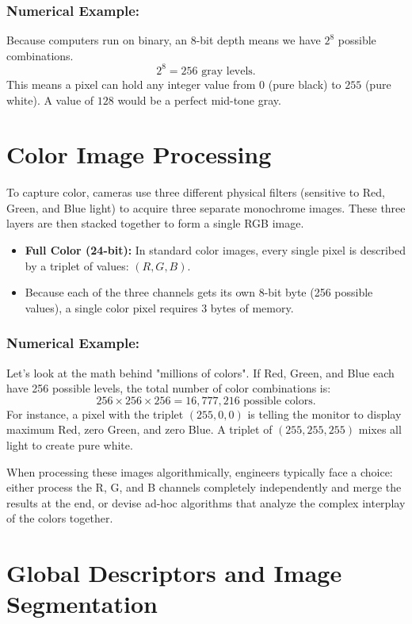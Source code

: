 \documentclass{report}
\begin{document}
\subsection{Numerical Example:}
Because computers run on binary, an 8-bit depth means we have $2^8$ possible combinations.
\[ 2^8 = 256 \text{ gray levels.} \]
This means a pixel can hold any integer value from $0$ (pure black) to $255$ (pure white). A value of $128$ would be a perfect mid-tone gray.

\chapter{Color Image Processing}
To capture color, cameras use three different physical filters (sensitive to Red, Green, and Blue light) to acquire three separate monochrome images. These three layers are then stacked together to form a single RGB image.

\begin{itemize}
    \item \textbf{Full Color (24-bit):} In standard color images, every single pixel is described by a triplet of values: $(R, G, B)$.
    \item Because each of the three channels gets its own 8-bit byte (256 possible values), a single color pixel requires 3 bytes of memory.
\end{itemize}

\subsection{Numerical Example:}
Let's look at the math behind "millions of colors". If Red, Green, and Blue each have 256 possible levels, the total number of color combinations is:
\[ 256 \times 256 \times 256 = 16,777,216 \text{ possible colors.} \]
For instance, a pixel with the triplet $(255, 0, 0)$ is telling the monitor to display maximum Red, zero Green, and zero Blue. A triplet of $(255, 255, 255)$ mixes all light to create pure white.

When processing these images algorithmically, engineers typically face a choice: either process the R, G, and B channels completely independently and merge the results at the end, or devise ad-hoc algorithms that analyze the complex interplay of the colors together.








\chapter{Global Descriptors and Image Segmentation}
\end{document}
